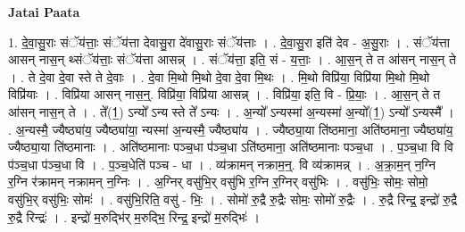 \documentclass[17pt]{extarticle}
\begin{document}
\textbf{Jatai Paata} \newline

1. दे॒वा॒सु॒राः संॅय॑त्ताः॒ संॅय॑त्ता देवासु॒रा दे॑वासु॒राः संॅय॑त्ताः । . दे॒वा॒सु॒रा इति॑ देव - अ॒सु॒राः । . संॅय॑त्ता आसन् नास॒न् थ्संॅय॑त्ताः॒ संॅय॑त्ता आसन्न् । . संॅय॑त्ता॒ इति॒ सं - य॒त्ताः॒ । . आ॒स॒न् ते त आ॑सन् नास॒न् ते । . ते दे॒वा दे॒वा स्ते ते दे॒वाः । . दे॒वा मि॒थो मि॒थो दे॒वा दे॒वा मि॒थः । . मि॒थो विप्रि॑या॒ विप्रि॑या मि॒थो मि॒थो विप्रि॑याः । . विप्रि॑या आसन् नास॒न्॒. विप्रि॑या॒ विप्रि॑या आसन्न् । . विप्रि॑या॒ इति॒ वि - प्रि॒याः॒ । . आ॒स॒न् ते त आ॑सन् नास॒न् ते । . ते᳚(1॒) ऽन्यो᳚ ऽन्य स्ते ते᳚ ऽन्यः । . अ॒न्यो᳚ ऽन्यस्मा॑ अ॒न्यस्मा॑ अ॒न्यो᳚(1॒) ऽन्यो᳚ ऽन्यस्मै᳚ । . अ॒न्यस्मै॒ ज्यैष्ठ्या॑य॒ ज्यैष्ठ्या॑या॒ न्यस्मा॑ अ॒न्यस्मै॒ ज्यैष्ठ्या॑य । . ज्यैष्ठ्या॒या ति॑ष्ठमाना॒ अति॑ष्ठमाना॒ ज्यैष्ठ्या॑य॒ ज्यैष्ठ्या॒या ति॑ष्ठमानाः । . अति॑ष्ठमानाः पञ्च॒धा प॑ञ्च॒धा ऽति॑ष्ठमाना॒ अति॑ष्ठमानाः पञ्च॒धा । . प॒ञ्च॒धा वि वि प॑ञ्च॒धा प॑ञ्च॒धा वि । . प॒ञ्च॒धेति॑ पञ्च - धा । . व्य॑क्रामन् नक्राम॒न्॒. वि व्य॑क्रामन्न् । . अ॒क्रा॒म॒न् न॒ग्नि र॒ग्नि र॑क्रामन् नक्रामन् न॒ग्निः । . अ॒ग्निर् वसु॑भि॒र् वसु॑भि र॒ग्नि र॒ग्निर् वसु॑भिः । . वसु॑भिः॒ सोमः॒ सोमो॒ वसु॑भि॒र् वसु॑भिः॒ सोमः॑ । . वसु॑भि॒रिति॒ वसु॑ - भिः॒ । . सोमो॑ रु॒द्रै रु॒द्रैः सोमः॒ सोमो॑ रु॒द्रैः । . रु॒द्रै रिन्द्र॒ इन्द्रो॑ रु॒द्रै रु॒द्रै रिन्द्रः॑ । . इन्द्रो॑ म॒रुद्भि॑र् म॒रुद्भि॒ रिन्द्र॒ इन्द्रो॑ म॒रुद्भिः॑ । \newline
\end{document}
